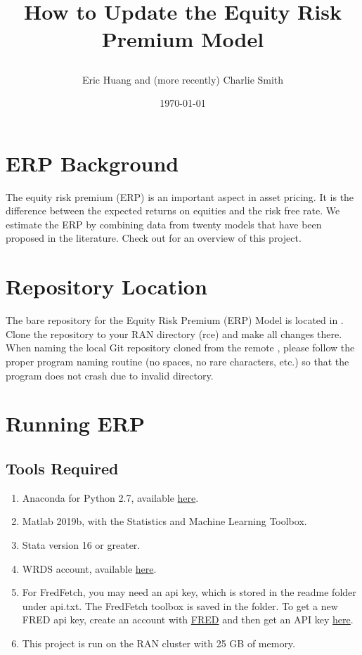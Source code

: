 \documentclass{article}
\begin{document}
	
	\title{How to Update the Equity Risk Premium Model
		\author{Eric Huang and (more recently) Charlie Smith}
		\date{\today}
	}
	
	\maketitle
	
	\section{ERP Background}
	
	The equity risk premium (ERP) is an important aspect in asset pricing. It is the difference between the expected returns on equities and the risk free rate. We estimate the ERP by combining data from twenty models that have been proposed in the literature. Check out  for an overview of this project. 
	
	\section{Repository Location}
	
	The bare repository for the Equity Risk Premium (ERP) Model is
	located in . Clone the repository to your RAN directory (rce) and make all changes there. When naming the local Git repository cloned from the remote , please follow the proper program naming routine (no spaces, no rare characters, etc.) so that the
	program does not crash due to invalid directory.
	
	\section{Running ERP}
	\subsection{Tools Required}
	\begin{enumerate}
		\item Anaconda for Python 2.7, available \href{https://www.continuum.io/downloads}{here}.
		\item Matlab 2019b, with the Statistics and Machine Learning Toolbox.
		\item Stata version 16 or greater. 
		\item WRDS account, available \href{https://wrds-web.wharton.upenn.edu/wrds/}{here}.
		\item For FredFetch, you may need an api key, which is stored in the readme folder under api.txt. The FredFetch toolbox is saved in the  folder. To get a new FRED api key, create an account with \href{https://fred.stlouisfed.org/}{FRED} and then get an API key \href{https://research.stlouisfed.org/docs/api/api_key.html}{here}.
		\item This project is run on the RAN cluster with 25 GB of memory. 
	\end{enumerate}
	
\end{document}
